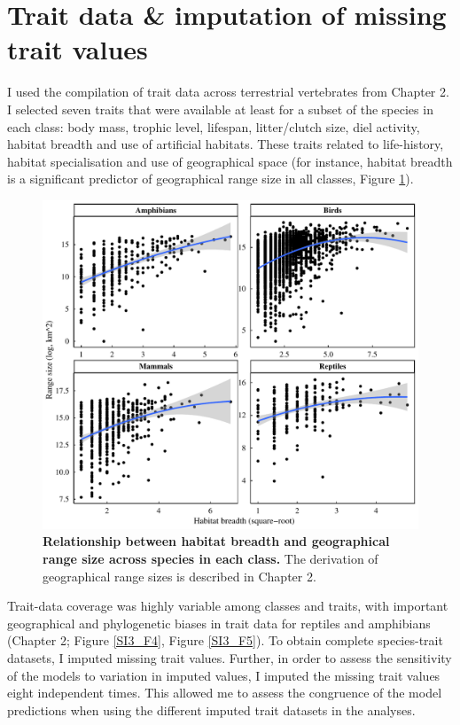 \pagebreak
\clearpage

\section{Trait data \& imputation of missing trait values}

I used the compilation of trait data across terrestrial vertebrates from Chapter 2. I selected seven traits that were available at least for a subset of the species in each class: body mass, trophic level, lifespan, litter/clutch size, diel activity, habitat breadth and use of artificial habitats. These traits related to life-history, habitat specialisation and use of geographical space (for instance, habitat breadth is a significant predictor of geographical range size in all classes, Figure \ref{SI3_F3}). 

\begin{figure}[h!]
\centering
\includegraphics[scale=0.6]{Supporting/Chapter3/Figures/SI_Rangesize_HB}
\caption[Relationship between habitat breadth and geographical range size across species in each class]{\textbf{Relationship between habitat breadth and geographical range size across species in each class.} The derivation of geographical range sizes is described in Chapter 2.}
\label{SI3_F3}
\end{figure}

Trait-data coverage was highly variable among classes and traits, with important geographical and phylogenetic biases in trait data for reptiles and amphibians (Chapter 2; Figure \ref{SI3_F4}, Figure \ref{SI3_F5}). To obtain complete species-trait datasets, I imputed missing trait values. Further, in order to assess the sensitivity of the models to variation in imputed values, I imputed the missing trait values eight independent times. This allowed me to assess the congruence of the model predictions when using the different imputed trait datasets in the analyses. 

